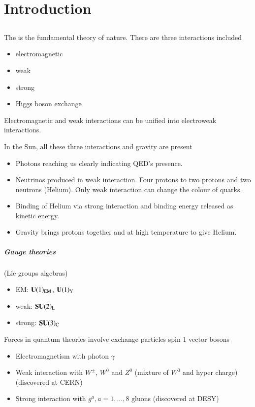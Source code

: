 \chapter{Introduction}
\section{\sm}
The \sm is the fundamental theory of nature. There are three interactions included
\begin{itemize}
   \item electromagnetic
   \item weak
   \item strong
   \item Higgs boson exchange
\end{itemize}
Electromagnetic and weak interactions can be unified into electroweak interactions. 

In the Sun, all these three interactions and gravity are present
\begin{itemize}
   \item Photons reaching us clearly indicating QED's presence.
   \item Neutrinos produced in weak interaction. Four protons to two protons and two neutrons (Helium). 
      Only weak interaction can change the colour of quarks. 
   \item Binding of Helium via strong interaction and binding energy released as kinetic energy.
   \item Gravity brings protons together and at high temperature to give Helium.
\end{itemize}

\paragraph{Gauge theories} (Lie groups algebras)
\begin{itemize}
   \item EM: $\mathbf{U}(1)_{\text{EM}}$, $\mathbf{U}(1)_{\text{Y}}$
   \item weak: $\mathbf{SU}(2)_\text{L}$
   \item strong: $\mathbf{SU}(3)_\text{C}$
\end{itemize}

Forces in quantum theories involve exchange particles spin $1$ vector bosons
\begin{itemize}
   \item Electromagnetism with photon $\gamma$
   \item Weak interaction with $W^{\pm}$, $W^0$ and $Z^0$ (mixture of $W^0$ and hyper charge) (discovered at CERN)
   \item Strong interaction with $g^a, a=1,\dots,8$ gluons (discovered at DESY)
\end{itemize}

